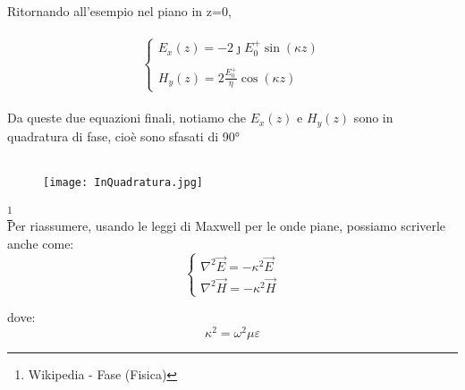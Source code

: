 Ritornando all'esempio nel piano in z=0, \\ \\ 

{\Large \begin{equation}
    \begin{cases}
        E_x (z) = -2 \jmath E_0^+ \sin(\kappa z) \\ \\ 
        H_y (z) = 2 \frac{E_0^+}{\eta} \cos(\kappa z)
    \end{cases}
\end{equation}} \\ 

Da queste due equazioni finali, notiamo che $E_x (z)$ e $H_y (z)$ sono in quadratura 
di fase, cioè sono sfasati di 90° \\ \\ 

\begin{figure}[h]
    \centering 
    \texttt{[image: InQuadratura.jpg]} 
    
\end{figure} 

\footnote{Wikipedia - Fase (Fisica)} \\ 

Per riassumere, usando le leggi di Maxwell per le onde piane, possiamo scriverle anche come: \\ 

{\Large \begin{equation}
    \begin{cases}
        \nabla ^{2} \vec{E} = -\kappa ^{2} \vec{E} \\ 
        \nabla ^{2} \vec{H} = -\kappa ^{2} \vec{H}
    \end{cases}
\end{equation}} 

dove: 
{
    \Large
    \begin{equation}
    \kappa ^{2} = \omega ^{2} \mu \varepsilon    
    \end{equation}
}

\newpage 








